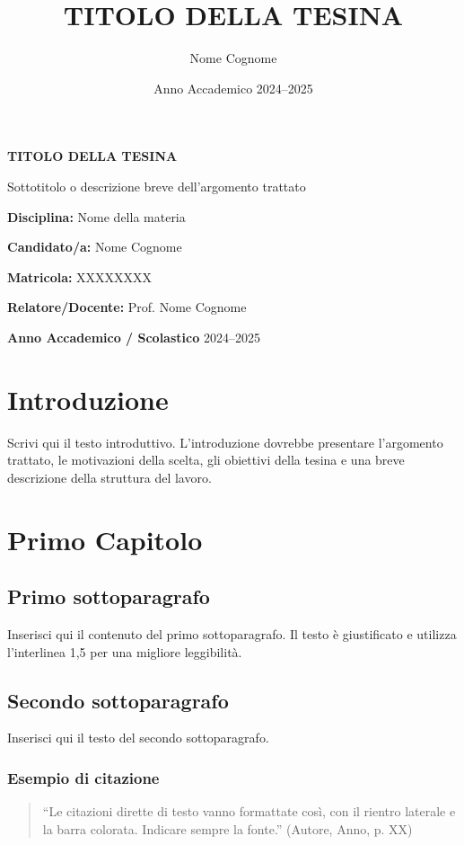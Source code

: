 \documentclass[12pt,a4paper]{report}
\title{TITOLO DELLA TESINA}
\author{Nome Cognome}
\date{Anno Accademico 2024–2025}
\begin{document}
\begin{titlepage}
\centering
{\huge \textbf{TITOLO DELLA TESINA} \par}
\vspace{0.5cm}
{\large Sottotitolo o descrizione breve dell'argomento trattato \par}
\vspace{1cm}
\textbf{Disciplina:} Nome della materia \par
\vspace{0.5cm}
\textbf{Candidato/a:} Nome Cognome \par
\textbf{Matricola:} XXXXXXXX \par
\vspace{0.5cm}
\textbf{Relatore/Docente:} Prof. Nome Cognome \par
\vspace{0.5cm}
\textbf{Anno Accademico / Scolastico} 2024–2025 \par
\end{titlepage}

\tableofcontents
\newpage

\section{Introduzione}
Scrivi qui il testo introduttivo. L'introduzione dovrebbe presentare l'argomento trattato, le motivazioni della scelta, gli obiettivi della tesina e una breve descrizione della struttura del lavoro.

\section{Primo Capitolo}

\subsection{Primo sottoparagrafo}
Inserisci qui il contenuto del primo sottoparagrafo. Il testo è giustificato e utilizza l'interlinea 1,5 per una migliore leggibilità.

\subsection{Secondo sottoparagrafo}
Inserisci qui il testo del secondo sottoparagrafo.

\subsubsection{Esempio di citazione}
\begin{quote}
``Le citazioni dirette di testo vanno formattate così, con il rientro laterale e la barra colorata. Indicare sempre la fonte.'' (Autore, Anno, p. XX)
\end{quote}
\end{document}
